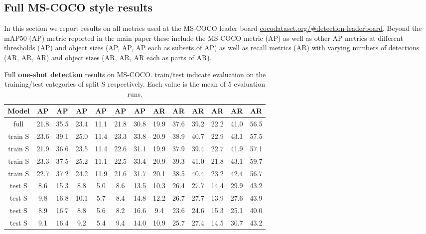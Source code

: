 \documentclass{article}
\newcommand{\coco}{MS-COCO\xspace}
\begin{document}
\subsection{Full \coco style results}

In this section we report results on all metrics used at the \coco leader board \url{cocodataset.org/\#detection-leaderboard}. Beyond the mAP50 (AP) metric reported in the main paper these include the \coco metric (AP) as well as other AP metrics at different thresholds (AP) and object sizes (AP, AP, AP each as subsets of AP) as well as recall metrics (AR) with varying numbers of detections (AR, AR, AR) and object sizes (AR, AR, AR each as parts of AR).

\begin{table}[h]
\begin{center}
\begin{small}
\begin{tabular}{c|ccc|ccc|ccc|ccc}
Model & AP & AP & AP & AP & AP & AP & AR & AR & AR & AR & AR & AR\\
\hline
full & 21.8 & 35.5 & 23.4 & 11.1 & 21.8 & 30.8 & 19.9 & 37.6 & 39.2 & 22.2 & 41.0 & 56.5 \\
\hline
train S & 23.6 & 39.1 & 25.0 & 11.4 & 23.3 & 33.8 & 20.9 & 38.9 & 40.7 & 22.9 & 43.1 & 57.5 \\
train S & 21.9 & 36.6 & 23.5 & 11.4 & 22.6 & 31.1 & 19.9 & 37.9 & 39.4 & 22.7 & 41.9 & 57.1 \\
train S & 23.3 & 37.5 & 25.2 & 11.1 & 22.5 & 33.4 & 20.9 & 39.3 & 41.0 & 21.8 & 43.1 & 59.7 \\
train S & 22.7 & 37.2 & 24.2 & 11.9 & 21.6 & 31.7 & 20.1 & 38.5 & 40.4 & 23.2 & 42.4 & 56.7 \\
\hline
test S & 8.6 & 15.3 & 8.8 & 5.0 & 8.6 & 13.5 & 10.3 & 26.4 & 27.7 & 14.4 & 29.9 & 43.2 \\
test S & 9.8 & 16.8 & 10.1 & 5.7 & 8.4 & 14.8 & 12.2 & 26.7 & 27.7 & 13.9 & 27.6 & 43.9 \\
test S & 8.9 & 16.7 & 8.8 & 5.6 & 8.2 & 16.6 & 9.4 & 23.6 & 24.6 & 15.3 & 25.1 & 40.0 \\
test S & 9.1 & 16.4 & 9.2 & 5.4 & 9.4 & 14.0 & 10.9 & 25.7 & 27.4 & 14.5 & 30.7 & 43.2
\end{tabular}
\end{small}
\end{center}
\caption{Full \textbf{one-shot detection} results on \coco. train/test indicate evaluation on the training/test categories of split S respectively. Each value is the mean of 5 evaluation runs.}
\vspace{-12pt}
\label{table:extended_one-shot_detection_results}
\end{table}
\end{document}
